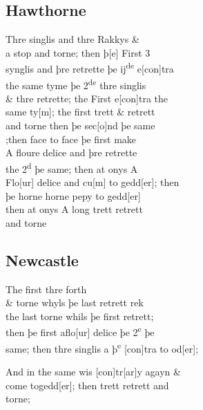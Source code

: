 \documentclass[12pt,letter]{article} %
\newcommand{\srcpg}[1]{
    \noindent{
        \color{Gray}{\rule[0.5ex]{\linewidth}{1pt}~#1} 
    
    }
}
\begin{document}
\srcpg{67}
\subsection{Hawthorne}
 Thre singlis and thre Rakkys \&\\
a stop and torne; then þ{[}e{]} First 3\\
synglis and þre retrette þe ij\textsuperscript{de} e{[}con{]}tra\\
the same tyme þe 2\textsuperscript{de} thre singlis\\
\& thre retrette; the First e{[}con{]}tra the\\
same ty{[}m{]}; the first trett \& retrett\\
and torne then þe sec{[}o{]}nd þe same\\
;then face to face þe first make\\
A floure delice and þre retrette\\
the 2\textsuperscript{d} þe same; then at onys A\\
Flo{[}ur{]} delice and cu{[}m{]} to gedd{[}er{]}; then\\
þe horne horne pepy to gedd{[}er{]}\\
then at onys A long trett retrett\\
and torne

\subsection{Newcastle}
The first thre forth\\
\& torne whyls þe last retrett rek\\
the last torne whils þe first retrett;\\
then þe first aflo{[}ur{]} delice þe 2\textsuperscript{e} þe\\
same; then thre singlis a þ\textsuperscript{e} {[}con{]}tra to od{[}er{]};
\srcpg{68}
And in the same wis {[}con{]}tr{[}ar{]}y agayn \&\\
come togedd{[}er{]}; then trett retrett and\\
torne;
\end{document}

